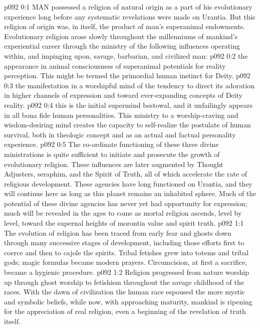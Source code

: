 \vs p092 0:1 MAN possessed a religion of natural origin as a part of his evolutionary experience long before any systematic revelations were made on Urantia. But this religion of  origin was, in itself, the product of man’s superanimal endowments. Evolutionary religion arose slowly throughout the millenniums of mankind’s experiential career through the ministry of the following influences operating within, and impinging upon, savage, barbarian, and civilized man:
\vs p092 0:2 \bibnobreakspace {} the appearance in animal consciousness of superanimal potentials for reality perception. This might be termed the primordial human instinct for Deity.
\vs p092 0:3 \pc {}\bibnobreakspace {} the manifestation in a worshipful mind of the tendency to direct its adoration in higher channels of expression and toward ever\hyp{}expanding concepts of Deity reality.
\vs p092 0:4 \pc {}\bibnobreakspace {} this is the initial supermind bestowal, and it unfailingly appears in all bona fide human personalities. This ministry to a worship\hyp{}craving and wisdom\hyp{}desiring mind creates the capacity to self\hyp{}realize the postulate of human survival, both in theologic concept and as an actual and factual personality experience.
\vs p092 0:5 \pc The co\hyp{}ordinate functioning of these three divine ministrations is quite sufficient to initiate and prosecute the growth of evolutionary religion. These influences are later augmented by Thought Adjusters, seraphim, and the Spirit of Truth, all of which accelerate the rate of religious development. These agencies have long functioned on Urantia, and they will continue here as long as this planet remains an inhabited sphere. Much of the potential of these divine agencies has never yet had opportunity for expression; much will be revealed in the ages to come as mortal religion ascends, level by level, toward the supernal heights of morontia value and spirit truth.
\vs p092 1:1 The evolution of religion has been traced from early fear and ghosts down through many successive stages of development, including those efforts first to coerce and then to cajole the spirits. Tribal fetishes grew into totems and tribal gods; magic formulas became modern prayers. Circumcision, at first a sacrifice, became a hygienic procedure.
\vs p092 1:2 Religion progressed from nature worship up through ghost worship to fetishism throughout the savage childhood of the races. With the dawn of civilization the human race espoused the more mystic and symbolic beliefs, while now, with approaching maturity, mankind is ripening for the appreciation of real religion, even a beginning of the revelation of truth itself.
